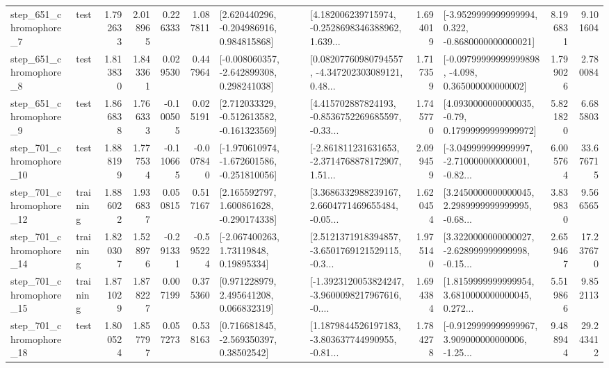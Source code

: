 \begin{tabular}{llrrrrllrlrr}
   step\_651\_chromophore\_7 &      test &      1.792633 &    2.018965 &      0.226333 &  1.087811 &    [2.620440296, -0.204986916, 0.984815868] &  [4.182006239715974, -0.2528698346388962, 1.639... &       1.694019 &  [-3.9529999999999994, 0.322, -0.8680000000000021] &            8.196831 &          9.101604 \\
   step\_651\_chromophore\_8 &      test &      1.813830 &    1.843361 &      0.029530 &  0.447964 &   [-0.008060357, -2.642899308, 0.298241038] &  [0.08207760980794557, -4.347202303089121, 0.48... &       1.717359 &  [-0.09799999999999898, -4.098, 0.365000000000002] &            1.799026 &          2.780084 \\
   step\_651\_chromophore\_9 &      test &      1.866838 &    1.766333 &     -0.100505 &  0.025191 &   [2.712033329, -0.512613582, -0.161323569] &  [4.415702887824193, -0.8536752269685597, -0.33... &       1.745770 &   [4.0930000000000035, -0.79, 0.17999999999999972] &            5.821820 &          6.685803 \\
  step\_701\_chromophore\_10 &      test &      1.888199 &    1.777534 &     -0.110665 & -0.007840 &  [-1.970610974, -1.672601586, -0.251810056] &  [-2.861811231631653, -2.3714768878172907, 1.51... &       2.099459 &  [-3.049999999999997, -2.710000000000001, -0.82... &            6.005764 &         33.676715 \\
  step\_701\_chromophore\_12 &  training &      1.886022 &    1.936837 &      0.050815 &  0.517167 &    [2.165592797, 1.600861628, -0.290174338] &  [3.3686332988239167, 2.6604771469655484, -0.05... &       1.620454 &  [3.2450000000000045, 2.2989999999999995, -0.68... &            3.839830 &          9.566565 \\
  step\_701\_chromophore\_14 &  training &      1.820307 &    1.528976 &     -0.291331 & -0.595224 &      [-2.067400263, 1.73119848, 0.19895334] &  [2.5121371918394857, -3.6501769121529115, -0.3... &       1.975140 &  [3.3220000000000027, -2.628999999999998, -0.15... &            2.659467 &         17.237670 \\
  step\_701\_chromophore\_15 &  training &      1.871029 &    1.878227 &      0.007199 &  0.375360 &     [0.971228979, 2.495641208, 0.066832319] &  [-1.3923120053824247, -3.9600098217967616, -0.... &       1.694384 &  [1.8159999999999954, 3.6810000000000045, 0.272... &            5.519866 &          9.852113 \\
  step\_701\_chromophore\_18 &      test &      1.800524 &    1.857797 &      0.057273 &  0.538163 &     [0.716681845, -2.569350397, 0.38502542] &  [1.1879844526197183, -3.803637744990955, -0.81... &       1.784278 &  [-0.9129999999999967, 3.909000000000006, -1.25... &            9.488944 &         29.243412 \\

\end{tabular}

